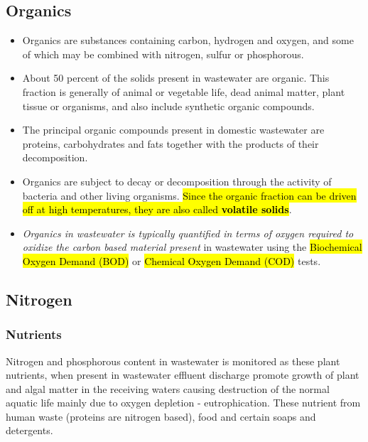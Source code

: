 		
\subsection{Organics}		
		\begin{itemize}
			\item Organics are substances containing carbon, hydrogen and oxygen, and some of which may be combined with nitrogen, sulfur or phosphorous.
			\item About 50 percent of the solids present in wastewater are organic.  This fraction is generally of animal or vegetable life, dead animal matter, plant tissue or organisms, and also include synthetic organic compounds.
			\item The principal organic compounds present in domestic wastewater are proteins, carbohydrates and fats together with the products of their decomposition.
			\item Organics are subject to decay or decomposition through the activity of bacteria and other living organisms.  \hl{Since the organic fraction can be driven off at high temperatures, they are also called \textbf{volatile solids}}.
			\item \emph{Organics in wastewater is typically quantified in terms of oxygen required to oxidize the carbon based material present} in wastewater using the \hl{Biochemical Oxygen Demand (BOD)} or \hl{Chemical Oxygen Demand (COD)} tests.
		\end{itemize}


	\subsection{Nitrogen}				

	\subsubsection{Nutrients}	
Nitrogen and phosphorous content in wastewater is monitored as these plant nutrients, when present in wastewater effluent discharge promote growth of plant and algal matter in the receiving waters causing destruction of the normal aquatic life mainly due to oxygen depletion - eutrophication.  These nutrient from human waste (proteins are nitrogen based), food and certain soaps and detergents. 					 

